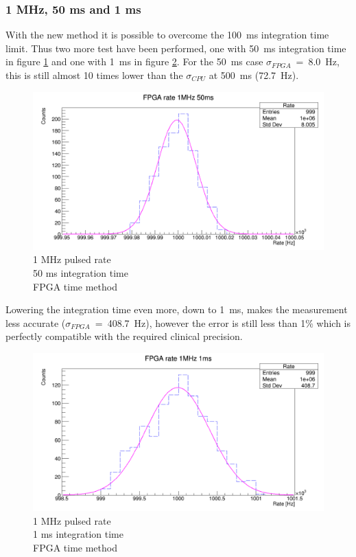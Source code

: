 \subsubsection{1 MHz, 50 ms and 1 ms}
\noindent With the new method it is possible to overcome the 100~ms integration time limit. Thus two more test have been performed, one with 50~ms integration time in figure \ref{fig:FPGA-time-rate-1MHz-50ms} and one with 1~ms in figure \ref{fig:FPGA-time-rate-1MHz-1ms}.
For the 50~ms case $\sigma_{FPGA}$~=~8.0~Hz, this is still almost 10 times lower than the $\sigma_{CPU}$ at 500~ms (72.7~Hz).   
\begin{figure}[H]
	\centering
	\includegraphics[width=0.95\linewidth]{IMG/ch5/RateMeasures/FPGA-time-rate-1MHz-50ms}
	\caption{1 MHz pulsed rate\\50 ms integration time\\FPGA time method}
	\label{fig:FPGA-time-rate-1MHz-50ms}
\end{figure}
\noindent Lowering the integration time even more, down to 1~ms, makes the measurement less accurate ($\sigma_{FPGA}$~=~408.7~Hz), however the error is still less than 1\% which is perfectly compatible with the required clinical precision.
\begin{figure}[H]
	\centering
	\includegraphics[width=0.95\linewidth]{IMG/ch5/RateMeasures/FPGA-time-rate-1MHz-1ms}
	\caption{1 MHz pulsed rate\\1 ms integration time\\FPGA time method}
	\label{fig:FPGA-time-rate-1MHz-1ms}
\end{figure}

